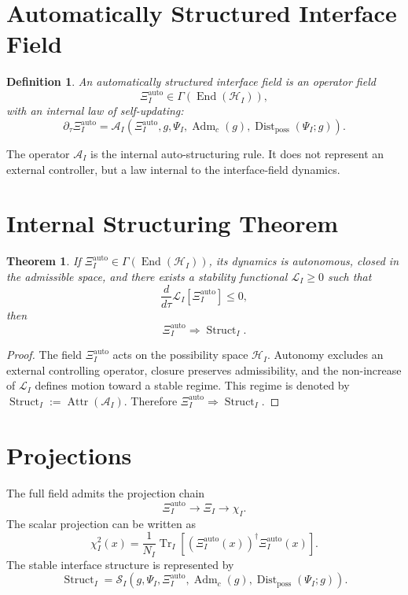 \documentclass[12pt,a4paper]{article}
\newtheorem{definition}{Definition}
\newtheorem{theorem}{Theorem}
\DeclareMathOperator{\Adm}{Adm}
\DeclareMathOperator{\End}{End}
\DeclareMathOperator{\Tr}{Tr}
\DeclareMathOperator{\Attr}{Attr}
\DeclareMathOperator{\Struct}{Struct}
\DeclareMathOperator{\Dist}{Dist}
\newcommand{\Hcal}{\mathcal H}
\newcommand{\XiAuto}{\Xi_I^{\mathrm{auto}}}
\begin{document}
\section{Automatically Structured Interface Field}
\begin{definition}
An automatically structured interface field is an operator field
\begin{equation}
\XiAuto\in\Gamma(\End(\Hcal_I)),
\end{equation}
with an internal law of self-updating:
\begin{equation}
\partial_\tau\XiAuto=\mathcal A_I(\XiAuto,g,\Psi_I,\Adm_c(g),\Dist_{\mathrm{poss}}(\Psi_I;g)).
\end{equation}
\end{definition}
The operator \(\mathcal A_I\) is the internal auto-structuring rule. It does not represent an external controller, but a law internal to the interface-field dynamics.

\section{Internal Structuring Theorem}
\begin{theorem}
If \(\XiAuto\in\Gamma(\End(\Hcal_I))\), its dynamics is autonomous, closed in the admissible space, and there exists a stability functional \(\mathcal L_I\geq0\) such that
\begin{equation}
\frac{d}{d\tau}\mathcal L_I[\XiAuto]\leq0,
\end{equation}
then
\begin{equation}
\boxed{\XiAuto\Rightarrow\Struct_I.}
\end{equation}
\end{theorem}

\begin{proof}
The field \(\XiAuto\) acts on the possibility space \(\Hcal_I\). Autonomy excludes an external controlling operator, closure preserves admissibility, and the non-increase of \(\mathcal L_I\) defines motion toward a stable regime. This regime is denoted by \(\Struct_I:=\Attr(\mathcal A_I)\). Therefore \(\XiAuto\Rightarrow\Struct_I\).
\end{proof}

\section{Projections}
The full field admits the projection chain
\begin{equation}
\boxed{\XiAuto\to\Xi_I\to\chi_I.}
\end{equation}
The scalar projection can be written as
\begin{equation}
\boxed{\chi_I^2(x)=\frac{1}{N_I}\Tr_I\left[(\XiAuto(x))^\dagger\XiAuto(x)\right].}
\end{equation}
The stable interface structure is represented by
\begin{equation}
\boxed{\Struct_I=\mathcal S_I(g,\Psi_I,\XiAuto,\Adm_c(g),\Dist_{\mathrm{poss}}(\Psi_I;g)).}
\end{equation}
\end{document}
